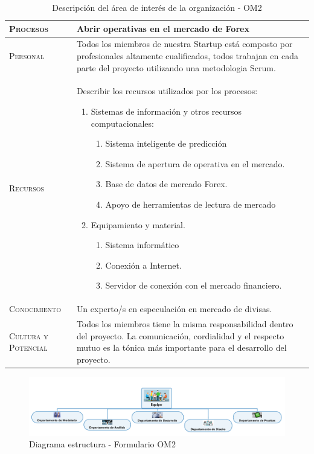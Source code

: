 \begin{table}[H]
\begin{tabularx}{\textwidth}{|l|X|}
\textsc{Procesos} & Abrir operativas en el mercado de Forex\\ \hline
\textsc{Personal} &  Todos los miembros de nuestra Startup está composto por profesionales altamente cualificados, todos trabajan en cada parte del proyecto utilizando una metodologia Scrum.\\ \hline
\textsc{Recursos} &  Describir los recursos utilizados por los procesos:
\begin{enumerate}
    \item Sistemas de información y otros recursos computacionales:
    \begin{enumerate}
      \item Sistema inteligente de predicción
      \item Sistema de apertura de operativa en el mercado.
      \item Base de datos de mercado Forex.
      \item Apoyo de herramientas de lectura de mercado
    \end{enumerate}
    \item Equipamiento y material.
    \begin{enumerate}
      \item Sistema informático
      \item Conexión a Internet.
      \item Servidor de conexión con el mercado financiero.
    \end{enumerate}
\end{enumerate}
\\ \hline
\textsc{Conocimiento} &  Un experto/s en especulación en mercado de divisas.\\ \hline
\textsc{Cultura y Potencial} &  Todos los miembros tiene la misma responsabilidad dentro del proyecto. La comunicación, cordialidad y el respecto mutuo es la tónica más importante para el desarrollo del proyecto.\\ \hline
\end{tabularx}
  \caption{\label{tab:OM2}Descripción del área de interés de la organización - OM2}
\end{table}


\begin{figure}[H]
	\centering
	\includegraphics[scale=0.50]{imagenes/diagramaEstructura_2.png}
	\caption{\label{fig:diagramaEstructura}Diagrama estructura - Formulario OM2}
\end{figure}

